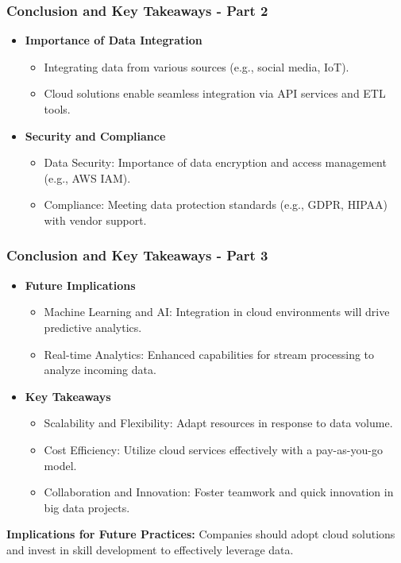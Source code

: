 \documentclass[aspectratio=169]{beamer}
\begin{document}
\begin{frame}[fragile]
    \frametitle{Conclusion and Key Takeaways - Part 2}
    \begin{itemize}
        \item \textbf{Importance of Data Integration}
            \begin{itemize}
                \item Integrating data from various sources (e.g., social media, IoT).
                \item Cloud solutions enable seamless integration via API services and ETL tools.
            \end{itemize}
        
        \item \textbf{Security and Compliance}
            \begin{itemize}
                \item Data Security: Importance of data encryption and access management (e.g., AWS IAM).
                \item Compliance: Meeting data protection standards (e.g., GDPR, HIPAA) with vendor support.
            \end{itemize}
    \end{itemize}
\end{frame}

\begin{frame}[fragile]
    \frametitle{Conclusion and Key Takeaways - Part 3}
    \begin{itemize}
        \item \textbf{Future Implications}
            \begin{itemize}
                \item Machine Learning and AI: Integration in cloud environments will drive predictive analytics.
                \item Real-time Analytics: Enhanced capabilities for stream processing to analyze incoming data.
            \end{itemize}
        
        \item \textbf{Key Takeaways}
            \begin{itemize}
                \item Scalability and Flexibility: Adapt resources in response to data volume.
                \item Cost Efficiency: Utilize cloud services effectively with a pay-as-you-go model.
                \item Collaboration and Innovation: Foster teamwork and quick innovation in big data projects.
            \end{itemize}
    \end{itemize}

    \textbf{Implications for Future Practices:} Companies should adopt cloud solutions and invest in skill development to effectively leverage data.
\end{frame}
\end{document}
